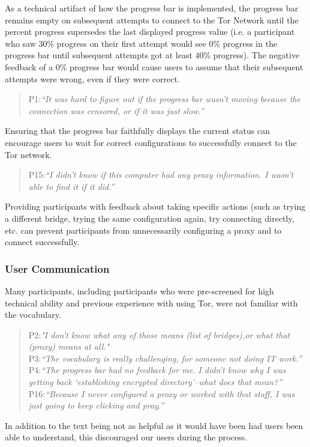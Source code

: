 \documentclass[USenglish,oneside,twocolumn]{article}
\begin{document}
As a technical artifact of how the progress bar is implemented, the progress bar remains empty on subsequent attempts to connect to the Tor Network until the percent progress supersedes the last displayed progress value (i.e. a participant who saw 30\% progress on their first attempt would see 0\% progress in the progress bar until subsequent attempts got at least 40\% progress). The negative feedback of a 0\% progress bar would cause users to assume that their subsequent attempts were wrong, even if they were correct. 
\begin{quotation}
\noindent P1:\textit{``It was hard to figure out if the progress bar wasn't moving because the connection was censored, or if it was just slow.''}
\end{quotation}

Ensuring that the progress bar faithfully displays the current status can encourage users to wait for correct configurations to successfully connect to the Tor network. 

\begin{quotation}
\noindent P15:\textit{``I didn't know if this computer had any proxy information. I wasn't able to find it if it did.''}
\end{quotation}

Providing participants with feedback about taking specific actions (such as trying a different bridge, trying the same configuration again, try connecting directly, etc. can prevent participants from unnecessarily configuring a proxy and to connect successfully.\\

\subsubsection{User Communication} 
Many participants, including participants who were pre-screened for high technical ability and previous experience with using Tor, were not familiar with the vocabulary. 
\begin{quotation}
\noindent P2:\textit{"I don't know what any of those means (list of bridges),or what that (proxy)
 means at all."}\\
 
 \noindent P3:\textit{``The vocabulary is really challenging, for someone not doing IT work.''}\\
 
 \noindent P4:\textit{``The progress bar had no feedback for me. I didn't know why I was getting back `establishing encrypted directory'--what does that mean?''}\\
 
 \noindent P16:\textit{``Because I never configured a proxy or worked with that stuff, I was just going to keep clicking and pray.''}
\end{quotation} 
In addition to the text being not as helpful as it would have been had users been able to understand, this discouraged our users during the process.\\
\end{document}
